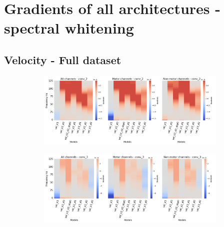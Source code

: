 \chapter{Gradients of all architectures - spectral whitening}\label{appendixD}

\section*{Velocity - Full dataset}\label{sec:velocity-appendixD}

\begin{figure}[!htpb]
\centering
\begin{subfigure}[b]{\textwidth}
   \includegraphics[width=0.85\linewidth]{img/appendix/D/conv-2/m/vel_model_gradients_all_kinds}
   \caption{}
   \label{fig:vel-pw-full-grads-conv-2}
\end{subfigure}

\begin{subfigure}[b]{\textwidth}
   \includegraphics[width=0.85\linewidth]{img/appendix/D/conv-3/m/vel_model_gradients_all_kinds}
   \caption{}
   \label{fig:vel-pw-full-grads-conv-3}
\end{subfigure}
\end{figure}
\clearpage   

